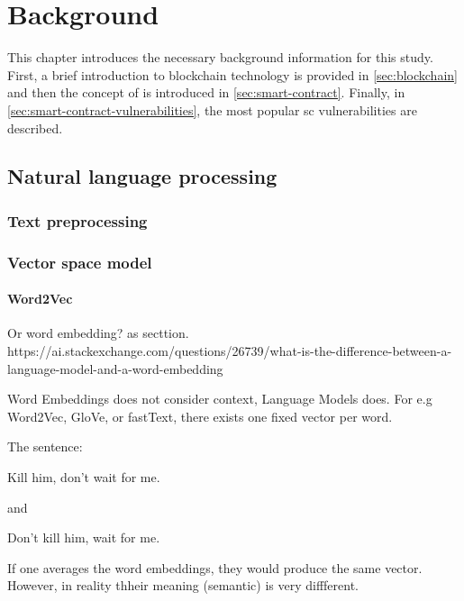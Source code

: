 \chapter{Background}
\label{chap:background}
This chapter introduces the necessary background information for this study. First, a brief introduction to blockchain technology is provided in \cref{sec:blockchain} and then the concept of  is introduced in \cref{sec:smart-contract}. Finally, in \cref{sec:smart-contract-vulnerabilities}, the most popular \acrshort{sc} vulnerabilities are described.


\section{Natural language processing}
\label{sec:natural-language-processing}

\subsection{Text preprocessing}
\label{sec:textt-preprocessing}

\subsection{Vector space model}
\label{sec:vector-space-model}

\subsubsection{Word2Vec}
\label{sec:vord2vec}
Or word embedding? as secttion.
https://ai.stackexchange.com/questions/26739/what-is-the-difference-between-a-language-model-and-a-word-embedding

Word Embeddings does not consider context, Language Models does.
For e.g Word2Vec, GloVe, or fastText, there exists one fixed vector per word.


The sentence:

Kill him, don't wait for me.

and

Don't kill him, wait for me.

If one averages the word embeddings, they would  produce the same vector. However,  in reality thheir meaning  (semantic) is very  diffferent.

